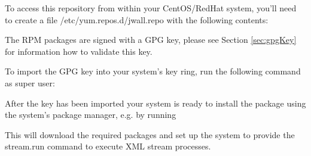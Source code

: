 To access this repository from within your CentOS/RedHat system,
you'll need to create a file {\ttfamily /etc/yum.repos.d/jwall.repo}
with the following contents:


The RPM packages are signed with a GPG key, please see Section
\ref{sec:gpgKey} for information how to validate this key.

To import the GPG key into your system's key ring, run the
following command as super user:


After the key has been imported your system is ready to install
the \streams package using the system's package manager, e.g.
by running


This will download the required packages and set up the system
to provide the {\ttfamily stream.run} command to execute XML
stream processes.